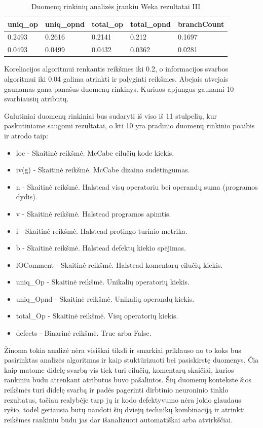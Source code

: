 \documentclass{VUMIFPSbakalaurinis}
\begin{document}
\begin{table}[H]
\centering
\caption{Duomenų rinkinių analizės įrankiu Weka rezultatai III}
\label{tab:weka_3}
\begin{tabular}{|lllll|}
\hline
uniq\_op & uniq\_opnd & total\_op & total\_opnd & branchCount \\ \hline
0.2493   & 0.2616     & 0.2141    & 0.212       & 0.1697      \\
0.0493   & 0.0499     & 0.0432    & 0.0362      & 0.0281      \\ \hline
\end{tabular}
\end{table}
Koreliacijos algoritmui renkantis reikšmes iki 0.2, o informacijos svarbos algoritmui iki 0.04 galima atrinkti ir palyginti reikšmes. Abejais atvejais gaunamas gana panašus duomenų rinkinys. Kuriuos apjungus gaunami 10 svarbiausių atributų.

Galutiniai duomenų rinkiniai bus sudaryti iš viso iš 11 stulpelių, kur paskutiniame saugomi rezultatai, o kti 10 yra pradinio duomenų rinkinio poaibis ir atrodo taip:
\begin{itemize} 
\item[] loc - Skaitinė reikšmė. McCabe eilučių kode kiekis.
\item[] iv(g) - Skaitinė reikšmė. McCabe dizaino sudėtingumas.
\item[] n - Skaitinė reikšmė. Halstead visų operatoriu bei operandų suma (programos dydis).
\item[] v - Skaitinė reikšmė. Halstead programos apimtis.
\item[] i - Skaitinė reikšmė. Halstead protingo turinio metrika.
\item[] b - Skaitinė reikšmė. Halstead defektų kiekio spėjimas.
\item[] lOComment - Skaitinė reikšmė. Halstead komentarų eilučių kiekis.
\item[] uniq\_Op - Skaitinė reikšmė. Unikalių operatorių kiekis.
\item[] uniq\_Opnd - Skaitinė reikšmė. Unikalių operandų kiekis.
\item[] total\_Op - Skaitinė reikšmė. Visų operatorių kiekis.
\item[] defects - Binarinė reikšmė. True arba False.
\end{itemize}

Žinoma tokia analizė nėra visiškai tiksli ir smarkiai priklauso no to koks bus pasirinktas analizės algoritmas ir kaip stuktūrizuoti bei pasiskirstę duomenys. Čia kaip matome didelę svarbą vis tiek turi eilučių, komentarų skaičiai, kurios rankiniu būdu atrenkant atributus buvo pašalintos. Šių duomenų kontekste šios reikšmės turi didelę svarbą ir padės pagerinti dirbtinio neuroninio tinklo rezultatus, tačiau realybėje tarp jų ir kodo defektyvumo nėra jokio glaudaus ryšio, todėl geriausia būtų naudoti šių dviejų technikų kombinaciją ir atrinkti reikšmes rankiniu būdu jas dar išanalizuoti automatiškai arba atvirkščiai.
\end{document}
